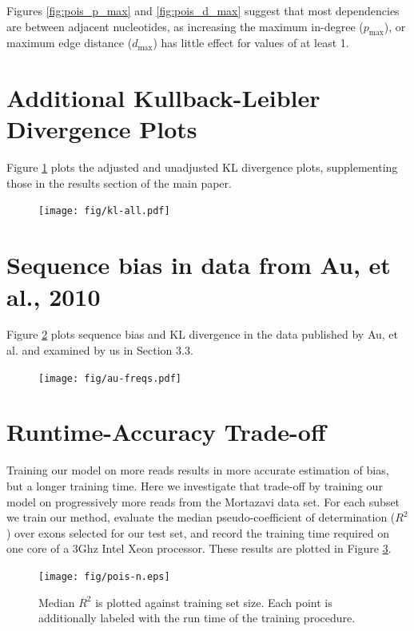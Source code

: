 \documentclass[letterpaper]{article}
\begin{document}
Figures \ref{fig:pois_p_max} and \ref{fig:pois_d_max} suggest that most
dependencies are between adjacent nucleotides, as increasing the maximum
in-degree ($p_{\text{max}}$), or maximum edge distance ($d_{\text{max}}$) has
little effect for values of at least 1.


\section{Additional Kullback-Leibler Divergence Plots}

Figure \ref{fig:klall} plots the adjusted and unadjusted KL divergence plots,
supplementing those in the results section of the main paper.

\begin{figure}[H]
\centerline{
\texttt{[image: fig/kl-all.pdf]}
}
\caption{}
\label{fig:klall}
\end{figure}


\section{Sequence bias in data from Au, et al., 2010}

Figure \ref{fig:aufreqs} plots sequence bias and KL divergence in the data
published by Au, et al. \cite{Au2010} and examined by us in Section 3.3.

\begin{figure}[H]
\centerline{\texttt{[image: fig/au-freqs.pdf]}}
\caption{}
\label{fig:aufreqs}
\end{figure}


\section{Runtime-Accuracy Trade-off}

Training our model on more reads results in more accurate estimation of bias,
but a longer training time. Here we investigate that trade-off by training our
model on progressively more reads from the Mortazavi data set. For each subset
we train our method, evaluate the median pseudo-coefficient of determination
($R^2$) over exons selected for our test set, and record the training time
required on one core of a 3Ghz Intel Xeon processor. These results are plotted
in Figure \ref{fig:poisn}.

\begin{figure}[H]
\texttt{[image: fig/pois-n.eps]}
\caption{Median $R^2$ is plotted against training set size. Each point is
additionally labeled with the run time of the training procedure.}
\label{fig:poisn}
\end{figure}
\end{document}
